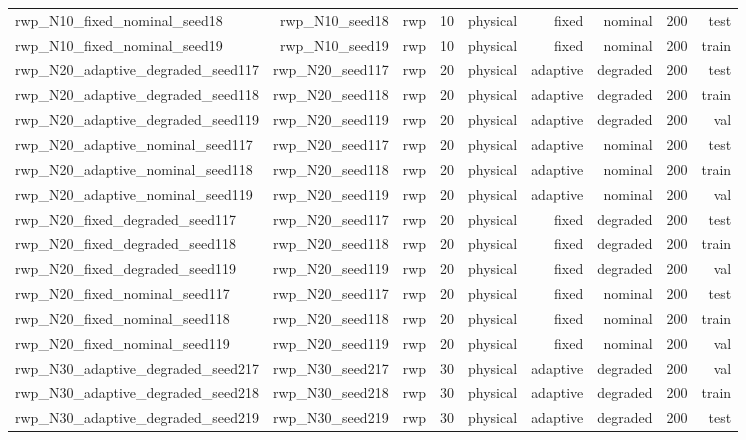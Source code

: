 \begin{tabular}{lrrrrrrrr}
rwp\_N10\_fixed\_nominal\_seed18 & rwp\_N10\_seed18 & rwp & 10 & physical & fixed & nominal & 200 & test \\
rwp\_N10\_fixed\_nominal\_seed19 & rwp\_N10\_seed19 & rwp & 10 & physical & fixed & nominal & 200 & train \\
rwp\_N20\_adaptive\_degraded\_seed117 & rwp\_N20\_seed117 & rwp & 20 & physical & adaptive & degraded & 200 & test \\
rwp\_N20\_adaptive\_degraded\_seed118 & rwp\_N20\_seed118 & rwp & 20 & physical & adaptive & degraded & 200 & train \\
rwp\_N20\_adaptive\_degraded\_seed119 & rwp\_N20\_seed119 & rwp & 20 & physical & adaptive & degraded & 200 & val \\
rwp\_N20\_adaptive\_nominal\_seed117 & rwp\_N20\_seed117 & rwp & 20 & physical & adaptive & nominal & 200 & test \\
rwp\_N20\_adaptive\_nominal\_seed118 & rwp\_N20\_seed118 & rwp & 20 & physical & adaptive & nominal & 200 & train \\
rwp\_N20\_adaptive\_nominal\_seed119 & rwp\_N20\_seed119 & rwp & 20 & physical & adaptive & nominal & 200 & val \\
rwp\_N20\_fixed\_degraded\_seed117 & rwp\_N20\_seed117 & rwp & 20 & physical & fixed & degraded & 200 & test \\
rwp\_N20\_fixed\_degraded\_seed118 & rwp\_N20\_seed118 & rwp & 20 & physical & fixed & degraded & 200 & train \\
rwp\_N20\_fixed\_degraded\_seed119 & rwp\_N20\_seed119 & rwp & 20 & physical & fixed & degraded & 200 & val \\
rwp\_N20\_fixed\_nominal\_seed117 & rwp\_N20\_seed117 & rwp & 20 & physical & fixed & nominal & 200 & test \\
rwp\_N20\_fixed\_nominal\_seed118 & rwp\_N20\_seed118 & rwp & 20 & physical & fixed & nominal & 200 & train \\
rwp\_N20\_fixed\_nominal\_seed119 & rwp\_N20\_seed119 & rwp & 20 & physical & fixed & nominal & 200 & val \\
rwp\_N30\_adaptive\_degraded\_seed217 & rwp\_N30\_seed217 & rwp & 30 & physical & adaptive & degraded & 200 & val \\
rwp\_N30\_adaptive\_degraded\_seed218 & rwp\_N30\_seed218 & rwp & 30 & physical & adaptive & degraded & 200 & train \\
rwp\_N30\_adaptive\_degraded\_seed219 & rwp\_N30\_seed219 & rwp & 30 & physical & adaptive & degraded & 200 & test \\

\end{tabular}
